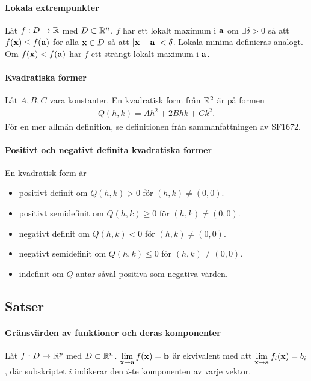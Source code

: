 \paragraph{Lokala extrempunkter}
Låt $f: D\to\mathbb{R}$ med $D\subset\mathbb{R}^n$. $f$ har ett lokalt maximum i $\vect{a}$ om $\exists\delta > 0$ så att $f(\vect{x})\leq f(\vect{a})$ för alla $\vect{x}\in D$ så att $\abs{\vect{x} - \vect{a}} < \delta$. Lokala minima definieras analogt. Om $f(\vect{x}) < f(\vect{a})$ har $f$ ett strängt lokalt maximum i $\vect{a}$.

\paragraph{Kvadratiska former}
Låt $A, B, C$ vara konstanter. En kvadratisk form från $\mathbb{R}^2$ är på formen
\begin{align*}
	Q(h, k) = Ah^2 + 2Bhk + Ck^2.
\end{align*}
För en mer allmän definition, se definitionen från sammanfattningen av SF1672.

\paragraph{Positivt och negativt definita kvadratiska former}
En kvadratisk form är
\begin{itemize}
	\item positivt definit om $Q(h, k) > 0$ för $(h, k)\neq (0,0)$.
	\item positivt semidefinit om $Q(h, k)\geq 0$ för $(h, k)\neq (0,0)$.
	\item negativt definit om $Q(h, k) < 0$ för $(h, k)\neq (0,0)$.
	\item negativt semidefinit om $Q(h, k)\leq 0$ för $(h, k)\neq (0,0)$.
	\item indefinit om $Q$ antar såväl positiva som negativa värden.
\end{itemize}

\subsection{Satser}

\paragraph{Gränsvärden av funktioner och deras komponenter}
Låt $f: D\to\mathbb{R}^p$ med $D\subset\mathbb{R}^n$. $\limit{\vect{x}}{\vect{a}}f(\vect{x}) = \vect{b}$ är ekvivalent med att $\limit{\vect{x}}{\vect{a}}f_i(\vect{x}) = b_i$, där subskriptet $i$ indikerar den $i$-te komponenten av varje vektor.

